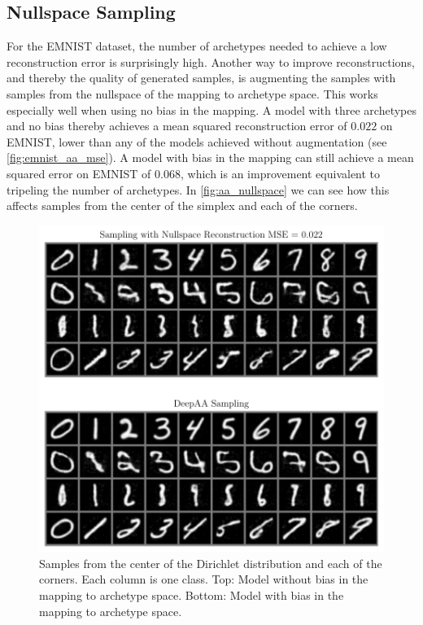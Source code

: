 \subsection{Nullspace Sampling}%
\label{sub:nullspace_sampling}

For the EMNIST dataset, the number of archetypes needed to achieve a low
reconstruction error is surprisingly high. Another way to improve
reconstructions, and thereby the quality of generated samples, is augmenting the
samples with samples from the nullspace of the mapping to archetype space. This
works especially well when using no bias in the mapping. A model with three
archetypes and no bias thereby achieves a mean squared reconstruction error of
$0.022$ on EMNIST, lower than any of the models achieved without augmentation
(see \autoref{fig:emnist_aa_mse}). A model with bias in the mapping can still
achieve a mean squared error on EMNIST of $0.068$, which is an improvement
equivalent to tripeling the number of archetypes. In \autoref{fig:aa_nullspace}
we can see how this affects samples from the center of the simplex and each of
the corners.
\begin{figure}[htpb]
	\centering
		\includegraphics{figures/samples/aa_nullspace.pdf}
	\caption{Samples from the center of the Dirichlet distribution and each
		of the corners. Each column is one class. Top: Model without bias in
		the mapping to archetype space. Bottom: Model with bias in the mapping to
		archetype space.}%
	\label{fig:aa_nullspace}
\end{figure}
